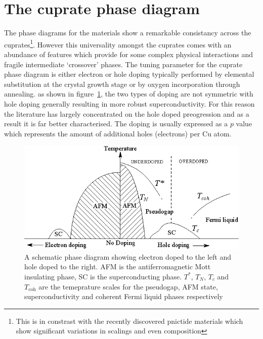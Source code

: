 
\section{The cuprate phase diagram}

The phase diagrams for the \highTc materials show a remarkable consistancy across the cuprates\footnote{This is in constrast with the recently discovered pnictide materials which show significant variations in scalings and even composition}. However this universality amongst the cuprates comes with an abundance of features which provide for some complex physical interactions and fragile intermediate `crossover' phases. The tuning parameter for the cuprate phase diagram is either electron or hole doping typically performed by elemental substitution at the crystal growth stage or by oxygen incorporation through annealing. as shown in figure~\ref{Fig:Intro:ElecHolePhaseDiagram}, the two types of doping are not symmetric with hole doping generally resulting in more robust superconductivity. For this reason the literature has largely concentrated on the hole doped preogression and as a result it is far better characterised. The doping is usually expressed as a $p$ value which represents the amount of additional holes (electrons) per Cu atom.
\begin{figure}[htbp]
    \begin{center}
        \includegraphics[scale=0.9]{Chapter-Introduction/Figures/ElecHolePhaseDiagram/ElecHolePhaseDiagram}
        \caption{A schematic phase diagram showing electron doped to the left and hole doped to the right. AFM is the antiferromagnetic Mott insulating phase, SC is the superconducting phase. $T^*$, $T_N$, $T_c$ and $T_{\textrm{coh}}$ are the temeprature scales for the pseudogap, AFM state, superconductivity and coherent Fermi liquid phases respectively}
        \label{Fig:Intro:ElecHolePhaseDiagram}
    \end{center}
\end{figure}

